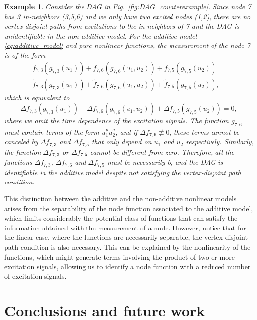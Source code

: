 \documentclass[letterpaper,10pt,journal]{IEEEtran}
\newtheorem{example}{Example}
\begin{document}
\begin{example}\label{ex:counterexample}
   Consider the DAG in Fig.~\ref{fig:DAG_counterexample}. Since node 7 has 3 in-neighbors (3,5,6) and we only have two excited nodes (1,2), there are no vertex-disjoint paths from excitations to the in-neighbors of 7 and the DAG is unidentifiable in the non-additive model. For the additive model \eqref{eq:additive_model} and pure nonlinear functions, the measurement of the node 7 is of the form  
   \begin{multline*}
f_{7,3}(g_{7,3}(u_1))+f_{7,6}(g_{7,6}(u_1,u_2))+f_{7,5}(g_{7,5}(u_2))=\\
\tilde f_{7,3}(g_{7,3}(u_1))+\tilde f_{7,6}(g_{7,6}(u_1,u_2))+\tilde f_{7,5}(g_{7,5}(u_2)),    
\end{multline*}
which is equivalent to
\begin{equation*}
\Delta f_{7,3}(g_{7,3}(u_1))+\Delta f_{7,6}(g_{7,6}(u_1,u_2))+\Delta f_{7,5}(g_{7,5}(u_2))=0,    
\end{equation*}
where we omit the time dependence of the excitation signals.
The function $g_{7,6}$ must contain terms of the form $u_1^pu_2^q$, and if $\Delta f_{7,6}\not\equiv 0$, these terms  cannot be canceled by $\Delta f_{7,3}$ and $\Delta f_{7,5}$ that only depend on $u_1$ and $u_2$ respectively. Similarly, the function $\Delta f_{7,3}$ or $\Delta f_{7,5}$ cannot be different from zero. Therefore, all the functions $\Delta f_{7,3}$, $\Delta f_{7,6}$ and $\Delta f_{7,5}$ must be necessarily 0, and  the DAG is identifiable in the additive model despite not satisfying the vertex-disjoint path condition.
\end{example}

This distinction between the additive and the non-additive nonlinear models arises from the separability of the node function associated to the additive model, which limits considerably the potential class of functions that can satisfy the information obtained with the measurement of a node. However, notice that for the linear case, where the functions are necessarily separable, the vertex-disjoint path condition is also necessary. This can be explained by the nonlinearity of the functions, which might generate terms involving the product of two or more excitation signals, allowing us to identify a node function with a reduced number of excitation signals. 




\section{Conclusions and future work}\label{sec:conclusions}
\end{document}
